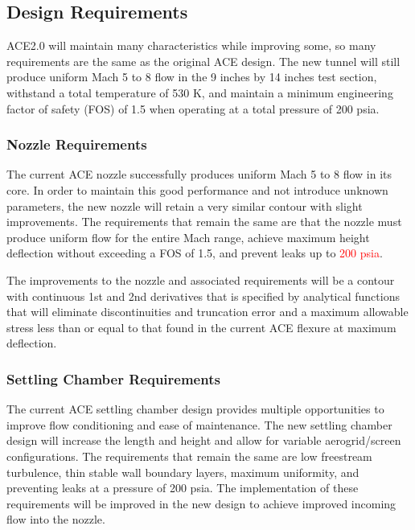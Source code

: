 \subsection{Design Requirements}

ACE2.0 will maintain many characteristics while improving some, so many requirements are the same as the original ACE design. The new tunnel will still produce uniform Mach 5 to 8 flow in the 9 inches by 14 inches test section, withstand a total temperature of 530 K, and maintain a minimum engineering factor of safety (FOS) of 1.5 when operating at a total pressure of 200 psia.

\subsubsection*{Nozzle Requirements}

The current ACE nozzle successfully produces uniform Mach 5 to 8 flow in its core. In order to maintain this good performance and not introduce unknown parameters, the new nozzle will retain a very similar contour with slight improvements. The requirements that remain the same are that the nozzle must produce uniform flow for the entire Mach range, achieve maximum height deflection without exceeding a FOS of 1.5, and prevent leaks up to \textcolor{red}{200 psia}.

The improvements to the nozzle and associated requirements will be a contour with continuous 1st and 2nd derivatives that is specified by analytical functions that will eliminate discontinuities and truncation error and a maximum allowable stress less than or equal to that found in the current ACE flexure at maximum deflection.

\subsubsection*{Settling Chamber Requirements}

The current ACE settling chamber design provides multiple opportunities to improve flow conditioning and ease of maintenance. The new settling chamber design will increase the length and height and allow for variable aerogrid/screen configurations. The requirements that remain the same are low freestream turbulence, thin stable wall boundary layers, maximum uniformity, and preventing leaks at a pressure of 200 psia. The implementation of these requirements will be improved in the new design to achieve improved incoming flow into the nozzle.

